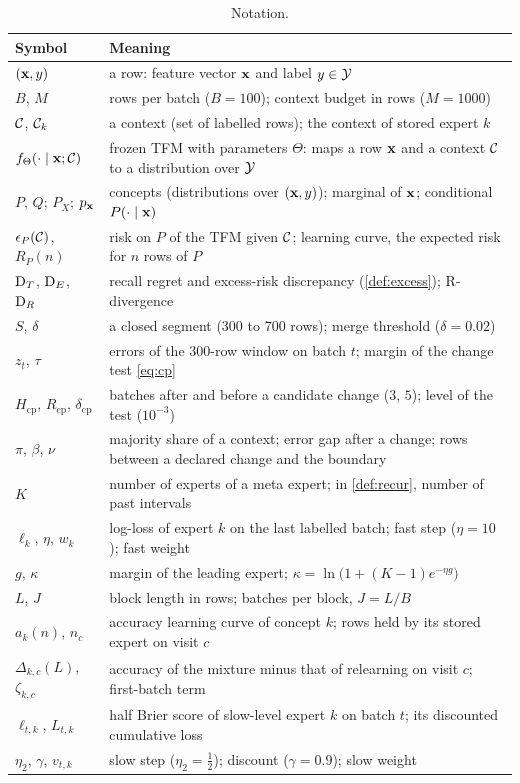 \documentclass[11pt]{article}
\theoremstyle{plain}
\theoremstyle{definition}
\theoremstyle{remark}
\begin{document}
\begin{table}[t]
  \centering
  \caption{Notation.}
  \label{tab:notation}
  \footnotesize
  \begin{tabular}{@{}lp{}@{}}
    \toprule
    Symbol & Meaning \\
    \midrule
    $(\mathbf{x},y)$ & a row: feature vector $\mathbf{x}$ and label $y\in\mathcal{Y}$ \\
    $B$, $M$ & rows per batch ($B=100$); context budget in rows ($M=1000$) \\
    $\mathcal{C}$, $\mathcal{C}_k$ & a context (set of labelled rows); the context of stored expert $k$ \\
    $f_\Theta(\cdot\mid\mathbf{x};\mathcal{C})$ & frozen TFM with parameters $\Theta$: maps a row $\mathbf{x}$ and a context $\mathcal{C}$ to a distribution over $\mathcal{Y}$ \\
    $P$, $Q$; $P_X$; $p_{\mathbf{x}}$ & concepts (distributions over $(\mathbf{x},y)$); marginal of $\mathbf{x}$; conditional $P(\cdot\mid\mathbf{x})$ \\
    $\epsilon_P(\mathcal{C})$, $R_P(n)$ & risk on $P$ of the TFM given $\mathcal{C}$; learning curve, the expected risk for $n$ rows of $P$ \\
    $\mathrm{D}_T$, $\mathrm{D}_E$, $\mathrm{D}_R$ & recall regret and excess-risk discrepancy (\cref{def:excess}); R-divergence \citep{zhao2023rdiv} \\
    $S$, $\delta$ & a closed segment (300 to 700 rows); merge threshold ($\delta=0.02$) \\
    $z_t$, $\tau$ & errors of the 300-row window on batch $t$; margin of the change test \eqref{eq:cp} \\
    $H_{\mathrm{cp}}$, $R_{\mathrm{cp}}$, $\delta_{\mathrm{cp}}$ & batches after and before a candidate change ($3$, $5$); level of the test ($10^{-3}$) \\
    $\pi$, $\beta$, $\nu$ & majority share of a context; error gap after a change; rows between a declared change and the boundary \\
    $K$ & number of experts of a meta expert; in \cref{def:recur}, number of past intervals \\
    $\ell_k$, $\eta$, $w_k$ & log-loss of expert $k$ on the last labelled batch; fast step ($\eta=10$); fast weight \\
    $g$, $\kappa$ & margin of the leading expert; $\kappa=\ln\bigl(1+(K-1)e^{-\eta g}\bigr)$ \\
    $L$, $J$ & block length in rows; batches per block, $J=L/B$ \\
    $a_k(n)$, $n_c$ & accuracy learning curve of concept $k$; rows held by its stored expert on visit $c$ \\
    $\Delta_{k,c}(L)$, $\zeta_{k,c}$ & accuracy of the mixture minus that of relearning on visit $c$; first-batch term \\
    $\ell_{t,k}$, $L_{t,k}$ & half Brier score of slow-level expert $k$ on batch $t$; its discounted cumulative loss \\
    $\eta_2$, $\gamma$, $v_{t,k}$ & slow step ($\eta_2=\tfrac12$); discount ($\gamma=0.9$); slow weight \\
    \bottomrule
  \end{tabular}
\end{table}
\end{document}
